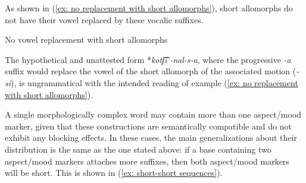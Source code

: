     \z
\z

As shown in (\ref{ex: no replacement with short allomorphs}), short allomorphs do not have their vowel replaced by these vocalic suffixes.

\pagebreak

\ea\label{ex: no replacement with short allomorphs}
{No vowel replacement with short allomorphs}

    \z
\z

The hypothetical and unattested form *\textit{kotʃ͡iˈ-nal-s-a}, where the progressive \textit{-a} suffix would replace the vowel of the short allomorph of the associated motion (\textit{-si}), is ungrammatical with the intended reading of example (\ref{ex: no replacement with short allomorphs}).

A single morphologically complex word may contain more than one aspect{\slash}mood marker, given that these constructions are semantically compatible and do not exhibit any blocking effects. In these cases, the main generalizations about their distribution is the same as the one stated above: if a base containing two aspect/mood markers attaches more suffixes, then both aspect/mood markers will be short. This is shown in (\ref{ex: short-short sequences}).

